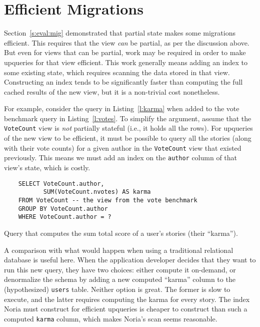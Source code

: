 \section{Efficient Migrations}

Section~\ref{s:eval:mig} demonstrated that partial state makes some migrations
efficient. This requires that the view \emph{can} be partial, as per the
discussion above. But even for views that can be partial, work may be required
in order to make upqueries for that view efficient. This work generally means
adding an index to some existing state, which requires scanning the data stored
in that view. Constructing an index tends to be significantly faster than
computing the full cached results of the new view, but it is a non-trivial cost
nonetheless.

For example, consider the query in Listing~\vref{l:karma} when added to the vote
benchmark query in Listing~\vref{l:votes}. To simplify the argument, assume that
the \texttt{VoteCount} view is \emph{not} partially stateful (i.e., it holds all
the rows). For upqueries of the new view to be efficient, it must be possible to
query all the stories (along with their vote counts) for a given author in the
\texttt{VoteCount} view that existed previously. This means we must add an index
on the \texttt{author} column of that view's state, which is costly.

\begin{listing}[h]
  \begin{verbatim}
    SELECT VoteCount.author,
           SUM(VoteCount.nvotes) AS karma
    FROM VoteCount -- the view from the vote benchmark
    GROUP BY VoteCount.author
    WHERE VoteCount.author = ?
  \end{verbatim}
  \caption{Query that computes the sum total score of a user's stories
  (their ``karma'').}
  \label{l:karma}
\end{listing}

A comparison with what would happen when using a traditional relational database
is useful here. When the application developer decides that they want to run
this new query, they have two choices: either compute it on-demand, or
denormalize the schema by adding a new computed ``karma'' column to the
(hypothesized) \texttt{users} table. Neither option is great. The former is slow
to execute, and the latter requires computing the karma for every story. The
index Noria must construct for efficient upqueries is cheaper to construct than
such a computed \texttt{karma} column, which makes Noria's scan seems
reasonable.


